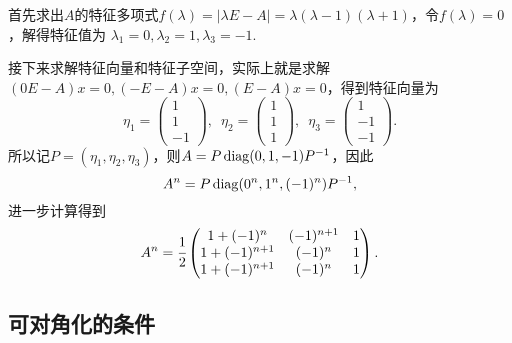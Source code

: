 \begin{solution}
    首先求出$A$的特征多项式$f(\lambda)=|\lambda E-A|=\lambda(\lambda-1)(\lambda+1)$，令$f(\lambda)=0$，解得特征值为 $\lambda_1=0,\lambda_2=1,\lambda_3=-1$.

    接下来求解特征向量和特征子空间，实际上就是求解$(0E-A)x=0,(-E-A)x=0,(E-A)x=0$，得到特征向量为
    \[\eta_1=\begin{pmatrix}
            1 \\ 1 \\ -1
        \end{pmatrix},\enspace \eta_2=\begin{pmatrix}
            1 \\ 1 \\ 1
        \end{pmatrix},\enspace \eta_3=\begin{pmatrix}
            1 \\ -1 \\ -1
        \end{pmatrix}.\]
    所以记$P=(\eta_1,\eta_2,\eta_3)$，则$A=P\operatorname{diag}(0,1,-1)P^{-1}$，因此
    \[A^n=P\operatorname{diag}(0^n,1^n,(-1)^n)P^{-1},\]
    进一步计算得到
    \[A^n=\cfrac{1}{2}\begin{pmatrix}
        1+(-1)^n & (-1)^{n+1} & 1 \\
        1+(-1)^{n+1} & (-1)^n & 1 \\
        1+(-1)^{n+1} & (-1)^n & 1
    \end{pmatrix}.\]
\end{solution}

\subsection{可对角化的条件}


